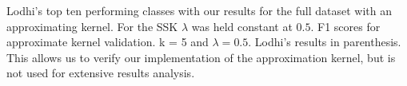 Lodhi's top ten performing classes with our results for the full dataset with an approximating kernel. For the SSK $ \lambda $ was held constant at $ 0.5 $. F1 scores for approximate kernel validation. k = 5 and $ \lambda = 0.5 $. Lodhi's results in parenthesis. This allows us to verify our implementation of the approximation kernel, but is not used for extensive results analysis.
